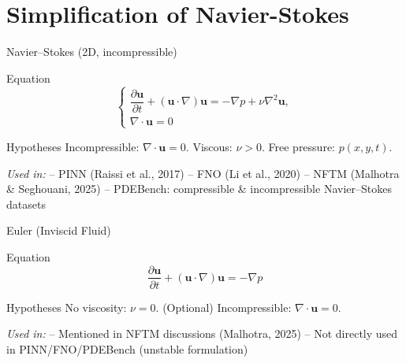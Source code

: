 \section{Simplification of Navier-Stokes}

\begin{secframe}
\small
\textcolor{red_unipd}{\Large Navier--Stokes (2D, incompressible)}

\vspace{0.6em}

\begin{alertblock}{Equation}
\[
\begin{cases}
\dfrac{\partial \mathbf{u}}{\partial t} 
+ (\mathbf{u}\!\cdot\!\nabla)\mathbf{u}
= -\nabla p + \nu\nabla^2 \mathbf{u},\\[4pt]
\nabla\!\cdot\!\mathbf{u} = 0
\end{cases}
\]
\end{alertblock}

\begin{block}{Hypotheses}
Incompressible: \(\nabla\!\cdot\!\mathbf{u} = 0\). \quad
Viscous: \(\nu>0\). \quad
Free pressure: \(p(x,y,t)\).
\end{block}

\vspace{0.5em}
\textit{Used in:}  
– PINN (Raissi et al., 2017)  
– FNO (Li et al., 2020)  
– NFTM (Malhotra \& Seghouani, 2025)  
– PDEBench: compressible \& incompressible Navier–Stokes datasets
\end{secframe}


\begin{secframe}
\small
\textcolor{red_unipd}{\Large Euler (Inviscid Fluid)}

\vspace{0.6em}

\begin{alertblock}{Equation}
\[
\dfrac{\partial \mathbf{u}}{\partial t} 
+ (\mathbf{u}\!\cdot\!\nabla)\mathbf{u}
= -\nabla p
\]
\end{alertblock}

\begin{block}{Hypotheses}
No viscosity: \(\nu = 0\). \quad
(Optional) Incompressible: \(\nabla\!\cdot\!\mathbf{u}=0\).
\end{block}

\vspace{0.5em}
\textit{Used in:}  
– Mentioned in NFTM discussions (Malhotra, 2025)  
– Not directly used in PINN/FNO/PDEBench (unstable formulation)
\end{secframe}


